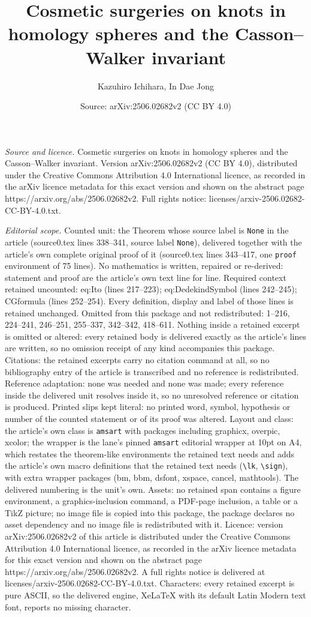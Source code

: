 \documentclass[10pt,a4paper]{amsart}
\title[Cosmetic surgeries on knots in homology spheres and the Cass]{Cosmetic surgeries on knots in homology spheres and the Casson--Walker invariant}
\author{Kazuhiro Ichihara, In Dae Jong}
\date{Source: arXiv:2506.02682v2 (CC BY 4.0)}
\begin{document}
\maketitle

\noindent\emph{Source and licence.} Cosmetic surgeries on knots in homology spheres and the Casson--Walker invariant. Version arXiv:2506.02682v2 (CC BY 4.0), distributed under the Creative Commons Attribution 4.0 International licence, as recorded in the arXiv licence metadata for this exact version and shown on the abstract page https://arxiv.org/abs/2506.02682v2. Full rights notice: licenses/arxiv-2506.02682-CC-BY-4.0.txt.\par\smallskip

\noindent\textit{Editorial scope.} Counted unit: the Theorem whose source label is \texttt{None} in the article (source0.tex lines 338--341, source label \texttt{None}), delivered together with the article's own complete original proof of it (source0.tex lines 343--417, one \texttt{proof} environment of 75 lines). No mathematics is written, repaired or re-derived: statement and proof are the article's own text line for line. Required context retained uncounted: eq:Ito (lines 217--223); eq:DedekindSymbol (lines 242--245); CGformula (lines 252--254). Every definition, display and label of those lines is retained unchanged. Omitted from this package and not redistributed: 1--216, 224--241, 246--251, 255--337, 342--342, 418--611. Nothing inside a retained excerpt is omitted or altered: every retained body is delivered exactly as the article's lines are written, so no omission receipt of any kind accompanies this package. Citations: the retained excerpts carry no citation command at all, so no bibliography entry of the article is transcribed and no reference is redistributed. Reference adaptation: none was needed and none was made; every reference inside the delivered unit resolves inside it, so no unresolved reference or citation is produced. Printed slips kept literal: no printed word, symbol, hypothesis or number of the counted statement or of its proof was altered. Layout and class: the article's own class is \texttt{amsart} with packages including graphicx, overpic, xcolor; the wrapper is the lane's pinned \texttt{amsart} editorial wrapper at 10pt on A4, which restates the theorem-like environments the retained text needs and adds the article's own macro definitions that the retained text needs (\texttt{\textbackslash lk}, \texttt{\textbackslash sign}), with extra wrapper packages (bm, bbm, dsfont, xspace, cancel, mathtools). The delivered numbering is the unit's own. Assets: no retained span contains a figure environment, a graphics-inclusion command, a PDF-page inclusion, a table or a TikZ picture; no image file is copied into this package, the package declares no asset dependency and no image file is redistributed with it. Licence: version arXiv:2506.02682v2 of this article is distributed under the Creative Commons Attribution 4.0 International licence, as recorded in the arXiv licence metadata for this exact version and shown on the abstract page https://arxiv.org/abs/2506.02682v2. A full rights notice is delivered at licenses/arxiv-2506.02682-CC-BY-4.0.txt. Characters: every retained excerpt is pure ASCII, so the delivered engine, XeLaTeX with its default Latin Modern text font, reports no missing character.
\end{document}
